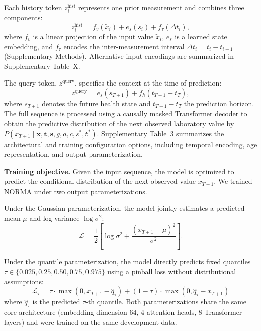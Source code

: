 \documentclass[11pt]{article}
\begin{document}
Each history token $z_i^{\text{hist}}$ represents one prior measurement and combines three components:
\begin{equation}
z_i^{\text{hist}} = f_v(\tilde{x}_i) + e_s(s_i) + f_\tau(\Delta t_i),
\end{equation}
where $f_v$ is a linear projection of the input value $\tilde{x}_i$, $e_s$ is a learned state embedding, and $f_\tau$ encodes the inter-measurement interval $\Delta t_i = t_i - t_{i-1}$ (Supplementary Methods). Alternative input encodings are summarized in Supplementary Table~X.

The query token, $z^{\text{query}}$, specifies the context at the time of prediction:
\begin{equation}
z^{\text{query}} = e_s(s_{T+1}) + f_h(t_{T+1} - t_T),
\end{equation}
where $s_{T+1}$ denotes the future health state and $t_{T+1} - t_T$ the prediction horizon. The full sequence is processed using a causally masked Transformer decoder to obtain the predictive distribution of the next observed laboratory value by $P(x_{T+1} \mid \mathbf{x}, \mathbf{t}, \mathbf{s}, g, a, c, s^*, t^*)$. Supplementary Table~3 summarizes the architectural and training configuration options, including temporal encoding, age representation, and output parameterization.

\textbf{Training objective.} Given the input sequence, the model is optimized to predict the conditional distribution of the next observed value $x_{T+1}$. We trained NORMA under two output parameterizations.

Under the Gaussian parameterization, the model jointly estimates a predicted mean $\mu$ and log-variance $\log \sigma^2$:
\begin{equation}
\mathcal{L} = \frac{1}{2}\left[\log \sigma^2 + \frac{(x_{T+1} - \mu)^2}{\sigma^2}\right].
\end{equation}

Under the quantile parameterization, the model directly predicts fixed quantiles $\tau \in \{0.025, 0.25, 0.50, 0.75, 0.975\}$ using a pinball loss without distributional assumptions:
\begin{equation}
\mathcal{L}_\tau = \tau \cdot \max(0, x_{T+1} - \hat{q}_\tau) + (1-\tau) \cdot \max(0, \hat{q}_\tau - x_{T+1})
\end{equation}
where $\hat{q}_\tau$ is the predicted $\tau$-th quantile. Both parameterizations share the same core architecture (embedding dimension 64, 4 attention heads, 8 Transformer layers) and were trained on the same development data.
\end{document}
